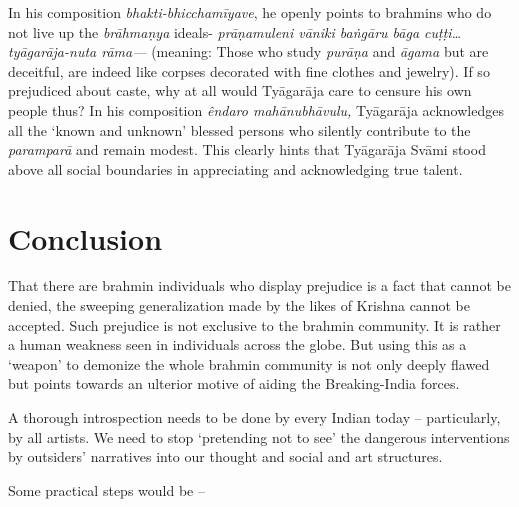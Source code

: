 In his composition \textit{bhakti-bhicchamīyave}, he openly points to brahmins who do not live up the \textit{brāhmaṇya} ideals- \textit{prāṇamuleni vāniki baṅgāru bāga cuṭṭi…tyāgarāja-nuta rāma—} (meaning: Those who study \textit{purāṇa} and \textit{āgama} but are deceitful, are indeed like corpses decorated with fine clothes and jewelry). If so prejudiced about caste, why at all would Tyāgarāja care to censure his own people thus? In his composition \textit{êndaro mahānubhāvulu,} Tyāgarāja acknowledges all the ‘known and unknown’ blessed persons who silently contribute to the \textit{paramparā} and remain modest. This clearly hints that Tyāgarāja Svāmi stood above all social boundaries in appreciating and acknowledging true talent.

\vspace{-.3cm}

\section*{Conclusion}

That there are brahmin individuals who display prejudice is a fact that cannot be denied, the sweeping generalization made by the likes of Krishna cannot be accepted. Such prejudice is not exclusive to the brahmin community. It is rather a human weakness seen in individuals across the globe. But using this as a ‘weapon’ to demonize the whole brahmin community is not only deeply flawed but points towards an ulterior motive of aiding the Breaking-India forces.

A thorough introspection needs to be done by every Indian today – particularly, by all artists. We need to stop ‘pretending not to see’ the dangerous interventions by outsiders’ narratives into our thought and social and art structures.

Some practical steps would be –

